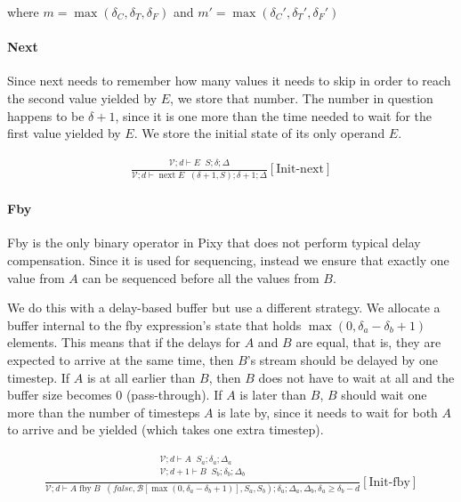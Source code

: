 \documentclass{scrartcl}
\DeclareMathOperator{\fby}{fby}
\DeclareMathOperator{\nextop}{next}
\DeclareMathOperator{\initrel}{\overset{init}{\Rightarrow}}
\begin{document}
    where $m = \max(\delta_C, \delta_T, \delta_F)$ and $m' = \max(\delta_C', \delta_T', \delta_F')$
    
    \paragraph{Next}
    
    Since next needs to remember how many values it needs to skip in order to reach the second value yielded by $E$, we store that number. The number in question happens to be $\delta+1$, since it is one more than the time needed to wait for the first value yielded by $E$. We store the initial state of its only operand $E$.
    
    \begin{align*}
    \frac{
        \begin{matrix}
        \mathcal{V}; d \vdash E \initrel S; \delta; \Delta
        \end{matrix}
    }{
        \mathcal{V}; d \vdash \nextop E \initrel (\delta+1, S); \delta+1; \Delta
    }[\text{Init-next}]
    \end{align*}
    
    \paragraph{Fby}
    
    Fby is the only binary operator in Pixy that does not perform typical delay compensation. Since it is used for sequencing, instead we ensure that exactly one value from $A$ can be sequenced before all the values from $B$.
    
    We do this with a delay-based buffer but use a different strategy. We allocate a buffer internal to the fby expression's state that holds $\max(0, \delta_a - \delta_b +1)$ elements. This means that if the delays for $A$ and $B$ are equal, that is, they are expected to arrive at the same time, then $B$'s stream should be delayed by one timestep. If $A$ is at all earlier than $B$, then $B$ does not have to wait at all and the buffer size becomes $0$ (pass-through). If $A$ is later than $B$, $B$ should wait one more than the number of timesteps $A$ is late by, since it needs to wait for both $A$ to arrive and be yielded (which takes one extra timestep).
    
    \begin{align*}
    \frac{
        \begin{matrix}
        \mathcal{V}; d \vdash A \initrel S_a; \delta_a; \Delta_a \\
        \mathcal{V}; d+1 \vdash B \initrel S_b; \delta_b; \Delta_b \\
        \end{matrix}
    }{
        \mathcal{V}; d \vdash A \fby B \initrel (false, \mathcal{B}[\max(0, \delta_a - \delta_b + 1)], S_a, S_b); \delta_a; \Delta_a, \Delta_b, \delta_a \geq \delta_b - d
    }[\text{Init-fby}]
    \end{align*}
    
\end{document}
